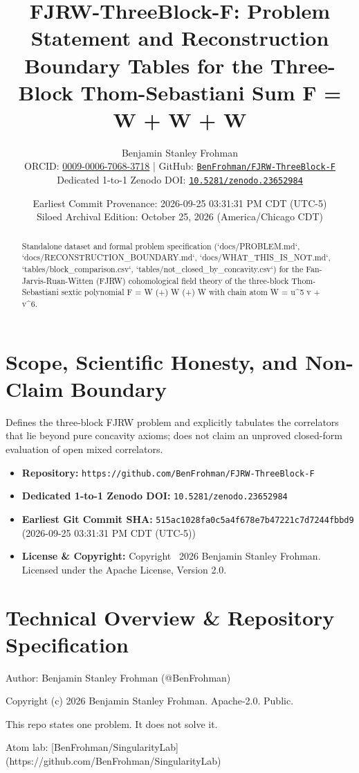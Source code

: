 \documentclass[11pt,a4paper]{article}
\title{\textbf{FJRW-ThreeBlock-F: Problem Statement and Reconstruction Boundary Tables for the Three-Block Thom-Sebastiani Sum F = W + W + W}}
\author{Benjamin Stanley Frohman\\
\small ORCID: \href{https://orcid.org/0009-0006-7068-3718}{0009-0006-7068-3718} \quad|\quad
GitHub: \href{https://github.com/BenFrohman/FJRW-ThreeBlock-F}{\texttt{BenFrohman/FJRW-ThreeBlock-F}}\\
\small Dedicated 1-to-1 Zenodo DOI: \href{https://doi.org/10.5281/zenodo.23652984}{\texttt{10.5281/zenodo.23652984}}}
\date{Earliest Commit Provenance: 2026-09-25 03:31:31 PM CDT (UTC-5)\\
Siloed Archival Edition: October 25, 2026 (America/Chicago CDT)}
\begin{document}
\maketitle

\begin{abstract}
Standalone dataset and formal problem specification (`docs/PROBLEM.md`, `docs/RECONSTRUCTION\_BOUNDARY.md`, `docs/WHAT\_THIS\_IS\_NOT.md`, `tables/block\_comparison.csv`, `tables/not\_closed\_by\_concavity.csv`) for the Fan-Jarvis-Ruan-Witten (FJRW) cohomological field theory of the three-block Thom-Sebastiani sextic polynomial F = W (+) W (+) W with chain atom W = u\textasciicircum{}5 v + v\textasciicircum{}6.
\end{abstract}

\section{Scope, Scientific Honesty, and Non-Claim Boundary}
Defines the three-block FJRW problem and explicitly tabulates the correlators that lie beyond pure concavity axioms; does not claim an unproved closed-form evaluation of open mixed correlators.

\begin{itemize}
  \item \textbf{Repository:} \texttt{https://github.com/BenFrohman/FJRW-ThreeBlock-F}
  \item \textbf{Dedicated 1-to-1 Zenodo DOI:} \texttt{10.5281/zenodo.23652984}
  \item \textbf{Earliest Git Commit SHA:} \texttt{515ac1028fa0c5a4f678e7b47221c7d7244fbbd9} (2026-09-25 03:31:31 PM CDT (UTC-5))
  \item \textbf{License \& Copyright:} Copyright \textcopyright\ 2026 Benjamin Stanley Frohman. Licensed under the Apache License, Version 2.0.
\end{itemize}

\section{Technical Overview \& Repository Specification}
Author: Benjamin Stanley Frohman (@BenFrohman)

Copyright (c) 2026 Benjamin Stanley Frohman. Apache-2.0. Public.

This repo states one problem. It does not solve it.

Atom lab: [BenFrohman/SingularityLab](https://github.com/BenFrohman/SingularityLab)
\end{document}
